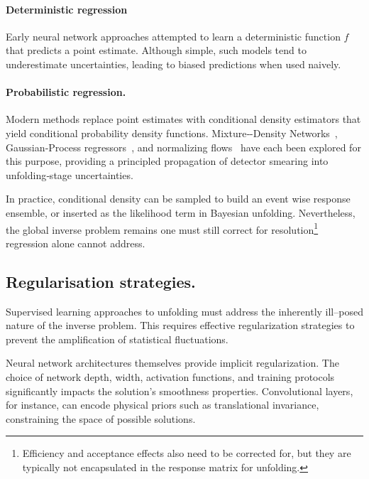             \paragraph{Deterministic regression}
                Early neural network approaches attempted to learn a deterministic function $f$ that predicts a point estimate.
                Although simple, such models tend to underestimate uncertainties, leading to biased predictions when used naively.
            \paragraph{Probabilistic regression.}
                Modern methods replace point estimates with conditional density estimators that yield conditional probability density functions.
                Mixture‐-Density Networks~\cite{burton_mixture_2021, chen_physics-guided_2022, kuleshov_calibrated_2025, prassa_bayesian_2025, peng_efficient_2025}, Gaussian‐Process
                regressors~\cite{iwata_meta-learning_2023}, and normalizing flows~\cite{du_unifying_2024, bellagente_go_2022}
                have each been explored for this purpose, providing a principled propagation
                of detector smearing into unfolding‐stage uncertainties.

            In practice, conditional density can be sampled to build an event wise response ensemble, or inserted as the likelihood term in Bayesian unfolding.
            Nevertheless, the global inverse problem remains one must still correct for resolution\footnote{Efficiency and acceptance effects also need to be corrected for, but they are typically not encapsulated in the response matrix for unfolding.} regression alone cannot address.
    \subsection{Regularisation strategies.}
    \label{subsubsec:regularisation-strategies}
        Supervised learning approaches to unfolding must address the inherently ill--posed nature of the inverse problem.
        This requires effective regularization strategies to prevent the amplification of statistical fluctuations.

        Neural network architectures themselves provide implicit regularization.
        The choice of network depth, width, activation functions, and training protocols significantly impacts the solution's smoothness properties.
        Convolutional layers, for instance, can encode physical priors such as translational invariance, constraining the space of possible solutions.


